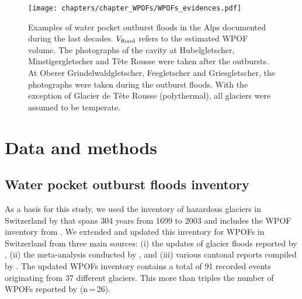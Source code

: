     \begin{figure}
    \centering
    \texttt{[image: chapters/chapter\_WPOFs/WPOFs\_evidences.pdf]}
    \caption{Examples of water pocket outburst floods in the Alps documented during the last decades. $V_{\rm{flood}}$ refers to the estimated WPOF volume. The photographs of the cavity at Hubelgletscher, Minstigergletscher and Tête Rousse were taken after the outbursts. At Oberer Grindelwaldgletscher, Feegletscher and Griesgletscher, the photographs were taken during the outburst floods. With the exception of Glacier de Tête Rousse (polythermal), all glaciers were assumed to be temperate.}
    \label{fig:WPOFs_evidences}
\end{figure}

\section{ Data and methods}


\subsection{ Water pocket outburst floods inventory}

As a basis for this study, we used the inventory of hazardous glaciers in Switzerland by \cite{Raymond&al2003} that spans 304 years from 1699 to 2003 and includes the WPOF inventory from \cite{Haeberli1983}. We extended and updated this inventory for WPOFs in Switzerland from three main sources: (i) the updates of glacier floods reported by \cite{GLAMOS_reports2022}, (ii) the meta-analysis conducted by \cite{Veh&al2022}, and (iii) various cantonal reports compiled by \citet{Lanz2022}. The updated WPOFs inventory contains a total of 91 recorded events originating from 37 different glaciers. This more than triples the number of WPOFs reported by \citet{Haeberli1983} (n\,=\,26). 

